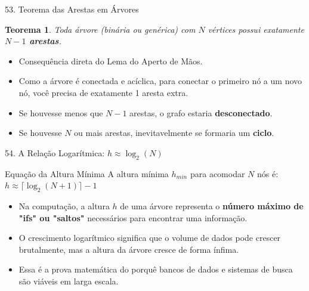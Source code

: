 \documentclass[9pt]{beamer}
\newtheorem{teorema}{Teorema}\usepackage{mathtools}
\begin{document}
    \begin{frame}{53. Teorema das Arestas em Árvores}
        \begin{teorema}
            Toda árvore (binária ou genérica) com $N$ vértices possui exatamente \textbf{$N - 1$ arestas}.
        \end{teorema}
        \vspace{0.3cm}
        \begin{itemize}
            \item Consequência direta do Lema do Aperto de Mãos. 
            \item Como a árvore é conectada e acíclica, para conectar o primeiro nó a um novo nó, você precisa de exatamente 1 aresta extra.
            \item Se houvesse menos que $N-1$ arestas, o grafo estaria \textbf{desconectado}.
            \item Se houvesse $N$ ou mais arestas, inevitavelmente se formaria um \textbf{ciclo}.
        \end{itemize}
    \end{frame}

    \begin{frame}{54. A Relação Logarítmica: $h \approx \log_2(N)$}
        \begin{block}{Equação da Altura Mínima}
            A altura mínima $h_{min}$ para acomodar $N$ nós é: \textbf{$h \approx \lceil \log_2(N+1) \rceil - 1$}
        \end{block}
        \vspace{0.3cm}
        \begin{itemize}
            \item Na computação, a altura $h$ de uma árvore representa o \textbf{número máximo de "ifs" ou "saltos"} necessários para encontrar uma informação.
            \item O crescimento logarítmico significa que o volume de dados pode crescer brutalmente, mas a altura da árvore cresce de forma ínfima.
            \item Essa é a prova matemática do porquê bancos de dados e sistemas de busca são viáveis em larga escala.
        \end{itemize}
    \end{frame}
\end{document}
